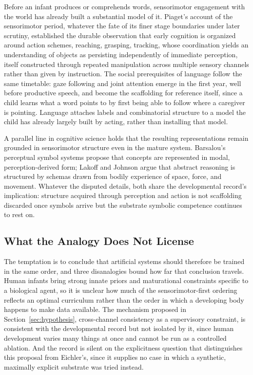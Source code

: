 \documentclass[11pt]{article}
\begin{document}
Before an infant produces or comprehends words, sensorimotor engagement with the world has already built a substantial model of it. Piaget's account of the sensorimotor period, whatever the fate of its finer stage boundaries under later scrutiny, established the durable observation that early cognition is organized around action schemes, reaching, grasping, tracking, whose coordination yields an understanding of objects as persisting independently of immediate perception, itself constructed through repeated manipulation across multiple sensory channels rather than given by instruction. The social prerequisites of language follow the same timetable: gaze following and joint attention emerge in the first year, well before productive speech, and become the scaffolding for reference itself, since a child learns what a word points to by first being able to follow where a caregiver is pointing. Language attaches labels and combinatorial structure to a model the child has already largely built by acting, rather than installing that model.

A parallel line in cognitive science holds that the resulting representations remain grounded in sensorimotor structure even in the mature system. Barsalou's perceptual symbol systems propose that concepts are represented in modal, perception-derived form; Lakoff and Johnson argue that abstract reasoning is structured by schemas drawn from bodily experience of space, force, and movement. Whatever the disputed details, both share the developmental record's implication: structure acquired through perception and action is not scaffolding discarded once symbols arrive but the substrate symbolic competence continues to rest on.

\subsection{What the Analogy Does Not License}

The temptation is to conclude that artificial systems should therefore be trained in the same order, and three disanalogies bound how far that conclusion travels. Human infants bring strong innate priors and maturational constraints specific to a biological agent, so it is unclear how much of the sensorimotor-first ordering reflects an optimal curriculum rather than the order in which a developing body happens to make data available. The mechanism proposed in Section~\ref{sec:hypothesis}, cross-channel consistency as a supervisory constraint, is consistent with the developmental record but not isolated by it, since human development varies many things at once and cannot be run as a controlled ablation. And the record is silent on the explicitness question that distinguishes this proposal from Eichler's, since it supplies no case in which a synthetic, maximally explicit substrate was tried instead.
\end{document}
